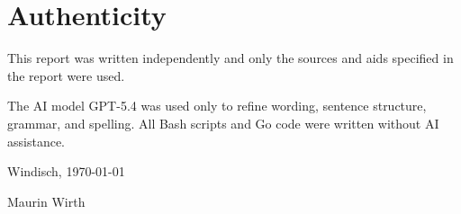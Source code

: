 \section*{Authenticity}

\noindent This report was written independently and only the sources and aids specified in the report were used.

\noindent The AI model GPT-5.4 was used only to refine wording, sentence structure, grammar, and spelling. All Bash scripts and Go code were written without AI assistance.

\vspace{4ex}

\noindent Windisch, \today

\vspace{8ex}

\noindent Maurin Wirth
